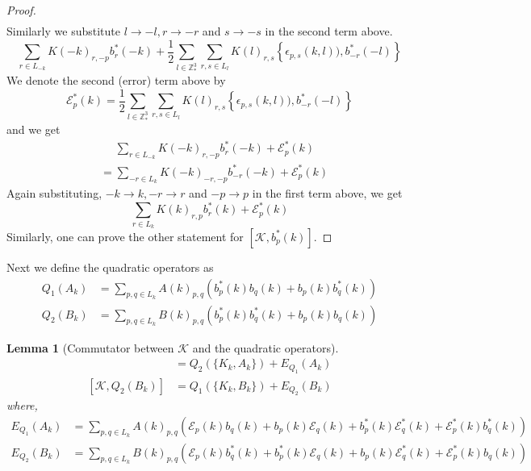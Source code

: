 \documentclass[sn-mathphys,Numbered]{sn-jnl}%
\theoremstyle{plain}
\newtheorem{lemma}[theorem]{Lemma}
\theoremstyle{definition}
\theoremstyle{remark}
\theoremstyle{plain}
\theoremstyle{definition}
\theoremstyle{remark}
\begin{document}
\begin{proof}
\begin{align}
    \end{align}
    Similarly we substitute $l\rightarrow -l, r\rightarrow -r $ and $ s\rightarrow -s$ in the second term above. 
    \begin{equation}
        \sum\limits_{r\in L_{-k}}K(-k)_{r,-p}b^*_r(-k) + \frac{1}{2}\sum\limits_{l\in \mathbb{Z}^3_*}\sum\limits_{r,s\in L_l}K(l)_{r,s}\left\{\epsilon_{p,s}(k,l)),b^*_{-r}(-l) \right\}
    \end{equation}
    We denote the second (error) term above by \begin{equation}
        \mathcal{E}^*_p(k)= \frac{1}{2}\sum\limits_{l\in \mathbb{Z}^3_*}\sum\limits_{r,s\in L_l}K(l)_{r,s}\left\{\epsilon_{p,s}(k,l)),b^*_{-r}(-l) \right\}
    \end{equation}
    and we get
    \begin{align}
        &\phantom{=}\sum\limits_{r\in L_{-k}}K(-k)_{r,-p}b^*_r(-k) + \mathcal{E}^*_p(k)\nonumber\\
        &=\sum\limits_{-r\in L_{k}}K(-k)_{-r,-p}b^*_{-r}(-k) + \mathcal{E}^*_p(k)\nonumber
    \end{align}
    Again substituting, $-k\rightarrow k, -r\rightarrow r $ and $ -p\rightarrow p$ in the first term above, we get
    \begin{equation}
        \sum\limits_{r\in L_{k}}K(k)_{r,p}b^*_{r}(k) + \mathcal{E}^*_p(k)
    \end{equation}
    Similarly, one can prove the other statement for $[\mathcal{K}, b^*_p(k)]$.
\end{proof}
Next we define the quadratic operators as 
\begin{align}
    Q_1(A_k)&=\sum\limits_{p,q \in L_{k}}A(k)_{p,q} \left(b^*_p(k)b_{q}(k)+b_{p}(k)b^*_{q}(k)\right)\\
    Q_2(B_k)&=  \sum\limits_{p,q \in L_{k}}B(k)_{p,q} \left(b^*_p(k)b^*_{q}(k)+b_{p}(k)b_{q}(k)\right)
\end{align}
\begin{lemma}[Commutator between $\mathcal{K} $ and the quadratic operators]
\begin{align}
    [\mathcal{K}, Q_1(A_k)] &= Q_2(\{K_k,A_k\}) + E_{Q_1}(A_k)\\
    [\mathcal{K}, Q_2(B_k)] &= Q_1(\{K_k,B_k\}) + E_{Q_2}(B_k)
\end{align}
 where,
 \begin{align}
     E_{Q_1}(A_k)&= \sum\limits_{p,q\in L_k}A(k)_{p,q}\left(\mathcal{E}_p(k)b_q(k)+b_p(k)\mathcal{E}_q(k) +b^*_p(k)\mathcal{E}^*_q(k) +\mathcal{E}^*_p(k)b^*_q(k)\right)\\
     E_{Q_2}(B_k)&= \sum\limits_{p,q\in L_k}B(k)_{p,q}\left(\mathcal{E}_p(k)b^*_q(k)+b^*_p(k)\mathcal{E}_q(k) +b_p(k)\mathcal{E}^*_q(k) +\mathcal{E}^*_p(k)b_q(k)\right)
 \end{align}
\end{lemma}
\end{document}
